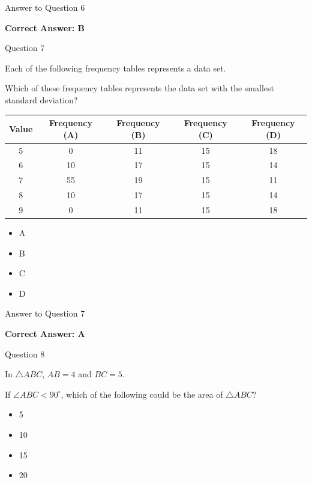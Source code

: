 \documentclass{beamer}
\begin{document}
\begin{frame}{Answer to Question 6}

\textbf{Correct Answer: B}

\end{frame}


\begin{frame}{Question 7}

Each of the following frequency tables represents a data set.

Which of these frequency tables represents the data set with the smallest standard deviation?

\vspace{0.3cm}

\begin{tabular}{c|c|c|c|c}
Value & Frequency (A) & Frequency (B) & Frequency (C) & Frequency (D)\\
\hline
5 & 0 & 11 & 15 & 18\\
6 & 10 & 17 & 15 & 14\\
7 & 55 & 19 & 15 & 11\\
8 & 10 & 17 & 15 & 14\\
9 & 0 & 11 & 15 & 18
\end{tabular}

\vspace{0.3cm}

\begin{itemize}
    \item[A.] A
    \item[B.] B
    \item[C.] C
    \item[D.] D
\end{itemize}

\end{frame}

\begin{frame}{Answer to Question 7}

\textbf{Correct Answer: A}

\end{frame}


\begin{frame}{Question 8}

In $\triangle ABC$, $AB=4$ and $BC=5$.

If $\angle ABC<90^\circ$, which of the following could be the area of $\triangle ABC$?

\begin{itemize}
    \item[A.] 5
    \item[B.] 10
    \item[C.] 15
    \item[D.] 20
\end{itemize}

\end{frame}
\end{document}
